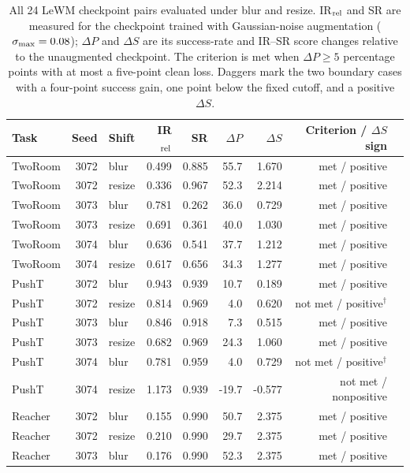 \begin{table}[t]
\centering
\caption{All 24 LeWM checkpoint pairs evaluated under blur and resize. IR$_{\rm rel}$ and SR are measured for the checkpoint trained with Gaussian-noise augmentation ($\sigma_{\max}{}=0.08$); $\Delta P$ and $\Delta S$ are its success-rate and IR--SR score changes relative to the unaugmented checkpoint. The criterion is met when $\Delta P\geq5$ percentage points with at most a five-point clean loss. Daggers mark the two boundary cases with a four-point success gain, one point below the fixed cutoff, and a positive $\Delta S$.}
\label{tab:cross-stressor-ir-sr-all-pairs}
\footnotesize
\setlength{\tabcolsep}{3pt}
\begin{tabular}{lrlrrrrrl}
\toprule
Task & Seed & Shift & IR$_{\rm rel}$ & SR & $\Delta P$ & $\Delta S$ & Criterion / $\Delta S$ sign \\
\midrule
TwoRoom & 3072 & blur & 0.499 & 0.885 & 55.7 & 1.670 & met / positive \\
TwoRoom & 3072 & resize & 0.336 & 0.967 & 52.3 & 2.214 & met / positive \\
TwoRoom & 3073 & blur & 0.781 & 0.262 & 36.0 & 0.729 & met / positive \\
TwoRoom & 3073 & resize & 0.691 & 0.361 & 40.0 & 1.030 & met / positive \\
TwoRoom & 3074 & blur & 0.636 & 0.541 & 37.7 & 1.212 & met / positive \\
TwoRoom & 3074 & resize & 0.617 & 0.656 & 34.3 & 1.277 & met / positive \\
PushT & 3072 & blur & 0.943 & 0.939 & 10.7 & 0.189 & met / positive \\
PushT & 3072 & resize & 0.814 & 0.969 & 4.0 & 0.620 & not met / positive$^\dag$ \\
PushT & 3073 & blur & 0.846 & 0.918 & 7.3 & 0.515 & met / positive \\
PushT & 3073 & resize & 0.682 & 0.969 & 24.3 & 1.060 & met / positive \\
PushT & 3074 & blur & 0.781 & 0.959 & 4.0 & 0.729 & not met / positive$^\dag$ \\
PushT & 3074 & resize & 1.173 & 0.939 & -19.7 & -0.577 & not met / nonpositive \\
Reacher & 3072 & blur & 0.155 & 0.990 & 50.7 & 2.375 & met / positive \\
Reacher & 3072 & resize & 0.210 & 0.990 & 29.7 & 2.375 & met / positive \\
Reacher & 3073 & blur & 0.176 & 0.990 & 52.3 & 2.375 & met / positive \\

\end{tabular}
\end{table}
